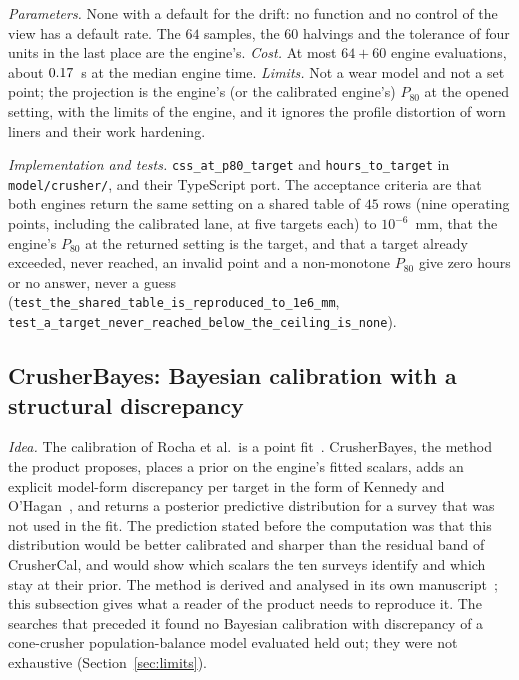 \emph{Parameters.} None with a default for the drift: no function and no control of the view has a default rate. The $64$ samples, the $60$
halvings and the tolerance of four units in the last place are the engine's. \emph{Cost.} At most $64+60$ engine evaluations, about
$0.17$~s at the median engine time. \emph{Limits.} Not a wear model and not a set point; the projection is the engine's (or the calibrated engine's)
$P_{80}$ at the opened setting, with the limits of the engine, and it ignores the profile distortion of worn liners and their work hardening.

\emph{Implementation and tests.} \texttt{css\_at\_p80\_target} and \texttt{hours\_to\_target} in \texttt{model/\allowbreak{}crusher/}, and their
TypeScript port. The acceptance criteria are that both engines return the same setting on a shared table of $45$ rows (nine operating points,
including the calibrated lane, at five targets each) to $10^{-6}$~mm, that the engine's $P_{80}$ at the returned setting is the target, and that a
target already exceeded, never reached, an invalid point and a non-monotone $P_{80}$ give zero hours or no answer, never a guess
(\texttt{test\_the\_shared\_table\_is\_reproduced\_to\_1e6\_mm}, \texttt{test\_a\_target\_never\_reached\_below\_the\_ceiling\_is\_none}).

\subsection{CrusherBayes: Bayesian calibration with a structural discrepancy}\label{sec:m-crusherbayes}

\emph{Idea.} The calibration of Rocha et al.\ is a point fit~\cite{rocha2024}. CrusherBayes, the method the product proposes, places a prior on the
engine's fitted scalars, adds an explicit model-form discrepancy per target in the form of Kennedy and O'Hagan~\cite{kennedy2001}, and returns a
posterior predictive distribution for a survey that was not used in the fit. The prediction stated before the computation was that this
distribution would be better calibrated and sharper than the residual band of CrusherCal, and would show which scalars the ten surveys identify and
which stay at their prior. The method is derived and analysed in its own manuscript~\cite{crusherbayes2026}; this subsection gives what a reader of
the product needs to reproduce it. The searches that preceded it found no Bayesian calibration with discrepancy of a cone-crusher
population-balance model evaluated held out; they were not exhaustive (Section~\ref{sec:limits}).

